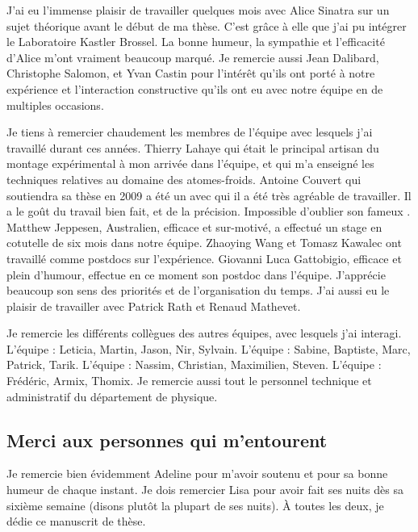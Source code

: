 \begin{ThesisAcknowledgments}
J'ai eu l'immense plaisir de travailler quelques mois avec Alice Sinatra sur un sujet théorique avant le début de ma thèse. C'est grâce à elle que j'ai pu intégrer le Laboratoire Kastler Brossel. La bonne humeur, la sympathie et l'efficacité d'Alice m'ont vraiment beaucoup marqué.
Je remercie aussi Jean Dalibard, Christophe Salomon, et Yvan Castin pour l'intérêt qu'ils ont porté à notre expérience et l'interaction constructive qu'ils ont eu avec notre équipe en de multiples occasions.


Je tiens à remercier chaudement les membres de l'équipe avec lesquels j'ai travaillé durant ces années.
Thierry Lahaye qui était le principal artisan du montage expérimental à mon arrivée dans l'équipe, et qui m'a enseigné les techniques relatives au domaine des atomes-froids. 
Antoine Couvert qui soutiendra sa thèse en 2009 a été un  avec qui il a été très agréable de travailler. Il a le goût du travail bien fait, et de la précision. Impossible d'oublier son fameux .
Matthew Jeppesen, Australien, efficace et sur-motivé, a effectué un stage en cotutelle de six mois dans notre équipe. 
Zhaoying Wang et Tomasz Kawalec ont travaillé comme postdocs sur l'expérience.
Giovanni Luca Gattobigio, efficace et plein d'humour, effectue en ce moment son postdoc dans l'équipe. J'apprécie beaucoup son sens des priorités et de l'organisation du temps.
J'ai aussi eu le plaisir de travailler avec Patrick Rath et Renaud Mathevet.

Je remercie les différents collègues des autres équipes, avec lesquels j'ai interagi.
L'équipe : Leticia, Martin, Jason, Nir, Sylvain.
L'équipe : Sabine, Baptiste, Marc, Patrick, Tarik.
L'équipe : Nassim, Christian, Maximilien, Steven.
L'équipe : Frédéric, Armix, Thomix.
Je remercie aussi tout le personnel technique et administratif du département de physique.

\subsection*{Merci aux personnes qui m'entourent}
{\AjouteLigne}
Je remercie bien évidemment Adeline pour m'avoir soutenu et pour sa bonne humeur de chaque instant. 
Je dois remercier Lisa pour avoir fait ses nuits dès sa sixième semaine (disons plutôt la plupart de ses nuits).
\`A toutes les deux, je dédie ce manuscrit de thèse.


\end{ThesisAcknowledgments}

